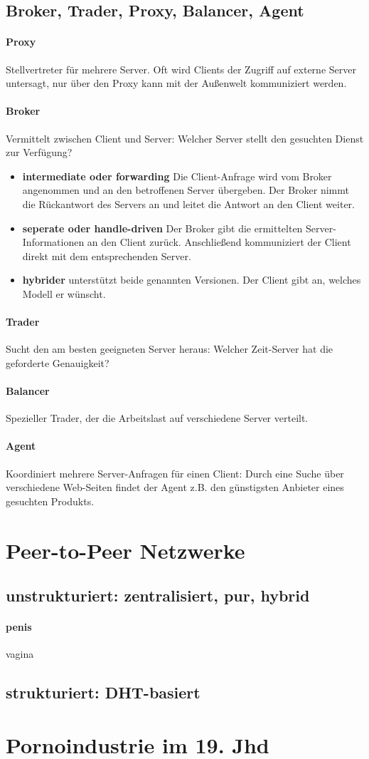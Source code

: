 \documentclass[a4paper]{article}
\begin{document}
	\subsection{Broker, Trader, Proxy, Balancer, Agent}
		\paragraph{Proxy}Stellvertreter für mehrere Server. Oft wird Clients der Zugriff auf externe Server untersagt, nur über den Proxy kann mit der Außenwelt kommuniziert werden.
		\paragraph{Broker} Vermittelt zwischen Client und Server: Welcher Server stellt den gesuchten Dienst zur Verfügung?
			\begin{itemize}
				\item \textbf{intermediate oder forwarding} Die Client-Anfrage wird vom Broker angenommen und an den betroffenen Server übergeben. Der Broker nimmt die Rückantwort des Servers an und leitet die Antwort an den Client weiter.
				\item \textbf{seperate oder handle-driven} Der Broker gibt die ermittelten Server-Informationen an den Client zurück. Anschließend kommuniziert der Client direkt mit dem entsprechenden Server.
				\item \textbf{hybrider} unterstützt beide genannten Versionen. Der Client gibt an, welches Modell er wünscht.
			\end{itemize}
		\paragraph{Trader} Sucht den am besten geeigneten Server heraus: Welcher Zeit-Server hat die geforderte Genauigkeit?
		\paragraph{Balancer}Spezieller Trader, der die Arbeitslast auf verschiedene Server verteilt.
		\paragraph{Agent}Koordiniert mehrere Server-Anfragen für einen Client: Durch eine Suche über verschiedene Web-Seiten findet der Agent z.B. den günstigsten Anbieter eines gesuchten Produkts.
\pagebreak
\section{Peer-to-Peer Netzwerke}
	\subsection{unstrukturiert: zentralisiert, pur, hybrid}
		\paragraph{penis}vagina
	\subsection{strukturiert: DHT-basiert}
	
\section{Pornoindustrie im 19. Jhd}
	
	
\end{document}

